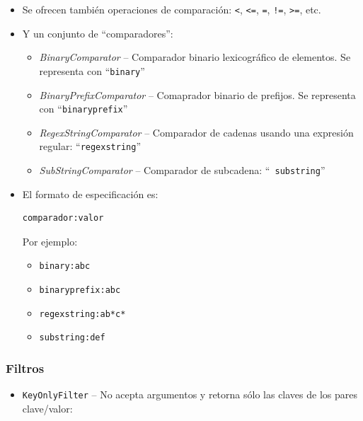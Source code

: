 \documentclass[14pt]{beamer}
\begin{document}
\begin{frame}
\begin{itemize}
\begin{frame}
\begin{itemize}
  \item Se ofrecen también operaciones de comparación: \verb|<|, \verb|<=|,
    \verb|=|, \verb|!=|, \verb|>=|, etc.

\framebreak

  \item Y un conjunto de ``comparadores'':

    \begin{itemize}
    \item {\em BinaryComparator} -- Comparador binario lexicográfico de
      elementos. Se representa con ``{\tt binary}''
    \item {\em BinaryPrefixComparator} -- Comaprador binario de prefijos.
      Se representa con ``{\tt binaryprefix}''
    \item {\em RegexStringComparator} -- Comparador de cadenas usando una
      expresión regular: ``{\tt regexstring}''
    \item {\em SubStringComparator} -- Comparador de subcadena: ``{\tt
        substring}''
    \end{itemize}

\framebreak

  \item El formato de especificación es:

\begin{verbatim}
comparador:valor
\end{verbatim}

    Por ejemplo:

    \begin{itemize}
    \item {\tt binary:abc}
    \item {\tt binaryprefix:abc}
    \item {\tt regexstring:ab*c*}
    \item {\tt substring:def}
    \end{itemize}

  \end{itemize}
\end{frame}

\begin{frame}
  \frametitle{Filtros}

  \begin{itemize}
  \item {\tt KeyOnlyFilter} -- No acepta argumentos y retorna sólo las
    claves de los pares clave/valor:

\lstset{basicstyle=\tiny\tt}


\end{itemize}
\end{frame}
\end{itemize}
\end{frame}
\end{document}
